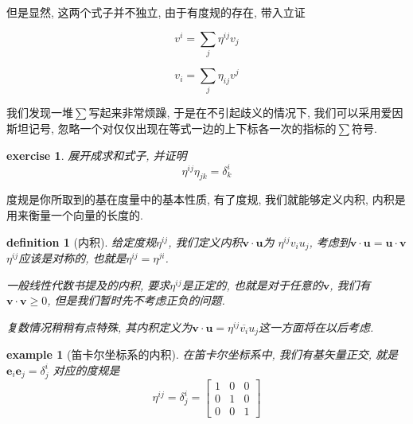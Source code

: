\documentclass[12pt]{ctexbook}
\newtheorem{definition}{definition}
\numberwithin{definition}{section}
\numberwithin{theorem}{section}
\newtheorem{exercise}{exercise}
\numberwithin{exercise}{section}
\newtheorem{example}{example}
\numberwithin{example}{section}
\numberwithin{lemma}{section}
\begin{document}
    但是显然, 这两个式子并不独立, 由于有度规的存在, 带入立证

    \begin{equation}
        v^i = \sum_{j} \eta^{ij} v_j
    \end{equation}

    \begin{equation}
        v_i = \sum_{j} \eta_{ij} v^j
    \end{equation}

    我们发现一堆\(\sum\)写起来非常烦躁, 于是在不引起歧义的情况下, 我们可以采用爱因斯坦记号,
    忽略一个对仅仅出现在等式一边的上下标各一次的指标的\(\sum\)符号.\footnotemark{}

    \begin{exercise}
        展开成求和式子, 并证明
        \begin{equation}
            \eta^{ij} \eta_{jk} = \delta^i_k
        \end{equation}
    \end{exercise}

    度规是你所取到的基在度量中的基本性质, 有了度规, 我们就能够定义内积, 内积是用来衡量一个向量的长度的.

    \begin{definition}
        [内积] 给定度规\(\eta^{ij}\), 我们定义内积\(\boldsymbol{v} \cdot \boldsymbol{u}\)为
        \(\eta^{ij} v_i u_j\), 考虑到\(\boldsymbol{v} \cdot \boldsymbol{u} = \boldsymbol{u} \cdot \boldsymbol{v}\)
        \(\eta^{ij}\)应该是对称的, 也就是\(\eta^{ij} = \eta^{ji}\).

        一般线性代数书提及的内积, 要求\(\eta^{ij}\)是正定的, 也就是对于任意的\(\boldsymbol{v}\), 我们有
        \(\boldsymbol{v} \cdot \boldsymbol{v} \geq 0\), 但是我们暂时先不考虑正负的问题.

        复数情况稍稍有点特殊, 其内积定义为\(\boldsymbol{v} \cdot \boldsymbol{u} = \eta^{ij} \overline{v_i} u_j\)这一方面将在以后考虑.
    \end{definition}

    \begin{example}
        [笛卡尔坐标系的内积] 在笛卡尔坐标系中, 我们有基矢量正交, 就是\(\boldsymbol{e}_i \boldsymbol{e}_j = \delta^i_j\)
        对应的度规是
        \begin{equation}
            \eta^{ij} = \delta^i_j = \begin{bmatrix}
                1 & 0 & 0 \\
                0 & 1 & 0 \\
                0 & 0 & 1
            \end{bmatrix}
        \end{equation}
    \end{example}
\end{document}

